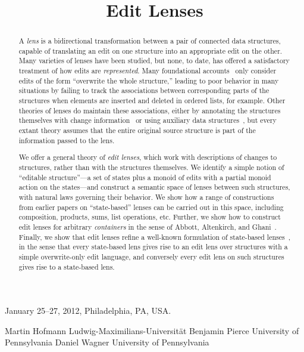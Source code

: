 \documentclass{sigplanconf}
\begin{document}
 {January 25--27, 2012, Philadelphia, PA, USA.}

\title{Edit Lenses}
\ifanon
\authorinfo
    {}
    {}
    {}
\else
\authorinfo
    {Martin Hofmann}
    {Ludwig-Maximilians-Universit\"at}
    {}
\authorinfo
    {Benjamin Pierce}
    {University of Pennsylvania}
    {}
\authorinfo
    {Daniel Wagner}
    {University of Pennsylvania}
    {}
\fi

\maketitle
\begin{abstract}
A {\em lens} is a bidirectional transformation between a pair of connected
data structures, capable of translating an edit on one structure into an
appropriate edit on the other.
%
Many varieties of lenses have been studied, but none, to date, has offered a
satisfactory treatment of how edits are {\em represented}.  Many
foundational accounts~\cite{Focal2005-shortcite,HofmannPierceWagner10} only consider
edits of the form ``overwrite the whole structure,'' leading to poor
behavior in many situations by failing to track the
associations between corresponding parts of the structures when elements are
inserted and deleted in ordered lists, for example.  Other theories of
lenses do maintain these associations, either by annotating the structures
themselves with change information~\cite{HuModels07,
  Hidaka10}\iflater{}\fi{} or using auxiliary data
structures~\cite{Matching10, Diskin-Delta11}, but every extant theory assumes
that the entire original source structure is part of the information passed
to the lens.

We offer a general theory of {\em edit lenses}, which work with
descriptions of changes to structures, rather than with the structures
themselves.  We identify a simple notion of ``editable structure''---a set
of states plus a monoid of edits with a partial monoid action on the states---and
construct a semantic space of lenses between such structures, with natural
laws governing their behavior.  We show how a range of constructions from
earlier papers on ``state-based'' lenses can be carried out in this space,
including composition, products, sums, list operations, etc.  Further, we show
how to construct edit lenses for arbitrary {\em containers} in the sense of
Abbott, Altenkirch, and Ghani~\cite{1195941}. Finally, we show that edit
lenses refine a well-known formulation of state-based
lenses~\cite{HofmannPierceWagner10}, in the sense that every state-based
lens gives rise to an edit lens over structures with a simple overwrite-only
edit language, and conversely every edit lens on such structures gives rise
to a state-based lens.
\end{abstract}
\end{document}
